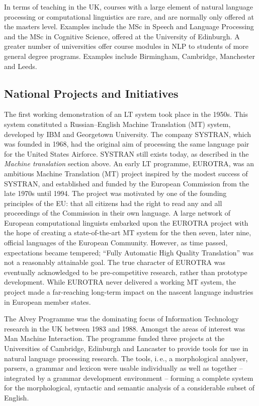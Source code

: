 \begin{multicols}{2}
In terms of teaching in the UK, courses with a large element of natural language processing or computational linguistics are rare, and are normally only offered at the masters level. Examples include the MSc in Speech and Language Processing and the MSc in Cognitive Science, offered at the University of Edinburgh. A greater number of universities offer course modules in NLP to students of more general degree programs. Examples include Birmingham, Cambridge, Manchester and Leeds. 

\subsection{National Projects and Initiatives}

The first working demonstration of an LT system took place in the 1950s. This system constituted a Russian--English Machine Translation (MT) system, developed by IBM and Georgetown University. The company SYSTRAN, which was founded in 1968, had the original aim of processing the same language pair for the United States Airforce. SYSTRAN still exists today, as described in the \textit{Machine translation} section above. 
%
An early LT programme, EUROTRA, was an ambitious Machine Translation (MT) project inspired by the modest success of SYSTRAN, and established and funded by the European Commission from the late 1970s until 1994. The project was motivated by one of the founding principles of the EU: that all citizens had the right to read any and all proceedings of the Commission in their own language. A large network of European computational linguists embarked upon the EUROTRA project with the hope of creating a state-of-the-art MT system for the then seven, later nine, official languages of the European Community. However, as time passed, expectations became tempered; “Fully Automatic High Quality Translation” was not a reasonably attainable goal. The true character of EUROTRA was eventually acknowledged to be pre-competitive research, rather than prototype development. While EUROTRA never delivered a working MT system, the project made a far-reaching long-term impact on the nascent language industries in European member states.

The Alvey Programme was the dominating focus of Information Technology research in the UK between 1983 and 1988. Amongst the areas of interest was Man Machine Interaction. The programme funded three projects at the Universities of Cambridge, Edinburgh and Lancaster to provide tools for use in natural language processing research. The tools, i.\,e., a morphological analyser, parsers, a grammar and lexicon were usable individually as well as together -- integrated by a grammar development environment -- forming a complete system for the morphological, syntactic and semantic analysis of a considerable subset of English.


\end{multicols}
